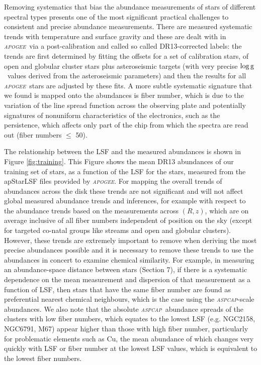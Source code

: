 \documentclass[14pt, preprint2]{aastex6}
\newcommand{\project}[1]{\textsl{#1}}
\newcommand{\apogee}{\project{\textsc{apogee}}}
\newcommand{\aspcap}{\project{\textsc{aspcap}}}
\newcommand{\logg}{\mbox{$\rm \log g$}}
\begin{document}
Removing systematics that bias the abundance measurements of stars of different spectral types presents one of the most significant practical challenges to consistent and precise abundance measurements. There are measured systematic trends with temperature and surface gravity and these are dealt with in \apogee\ via a post-calibration \citep{Holtzman2015} and called so called DR13-corrected labels: the trends are first determined by fitting the offsets for a set of calibration stars, of open and globular cluster stars plus asteroseismic targets (with very precise \logg\ values derived from the asteroseismic parameters) and then the results for all \apogee\ stars are adjusted by these fits.  A more subtle systematic signature that we found is mapped onto the abundances is fiber number, which is due to the variation of the line spread function across the observing plate and potentially signatures of nonuniform characteristics of the electronics, such as the persistence, which affects only part of the chip from which the spectra are read out (fiber numbers $\leq$ 50). 

The relationship between the LSF and the measured abundances is shown in Figure \ref{fig:training}. This Figure shows the mean DR13 abundances of our training set of stars,  as a function of the LSF for the stars, measured from the apStarLSF files provided by \apogee. For mapping the overall trends of abundances across the disk these trends are not significant and will not affect global measured abundance trends and inferences, for example with respect to the abundance trends based on the measurements across $(R,z)$, which are on average inclusive of all fiber numbers independent of position on the sky (except for targeted co-natal groups like streams and open and globular clusters). However, these trends are extremely important to remove when deriving the most precise abundances possible and it is necessary to remove these trends to use the abundances in concert to examine chemical similarity. For example, in measuring an abundance-space distance between stars (Section 7), if there is a systematic dependence on the mean measurement and dispersion of that measurement as a function of LSF, then stars that have the same fiber number are found as preferential nearest chemical neighbours, which is the case using the \aspcap-scale abundances. We also note that the absolute \aspcap\ abundance spreads of the clusters with low fiber numbers, which equates to the lowest LSF (e.g. NGC2158, NGC6791, M67) appear higher than those with high fiber number,  particularly for problematic elements such as Cu, the mean abundance of which  changes very quickly with LSF or fiber number at the lowest LSF values, which is equivalent to the lowest fiber numbers. 
\end{document}
